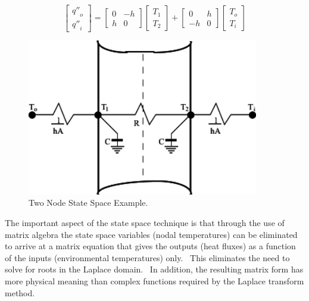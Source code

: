 \begin{equation}
\left[\begin{array}{c}{q''}_o \\ {q''}_i\end{array}\right] =
    \left[\begin{array}{cc}0 & -h \\ h & 0\end{array}\right] \left[\begin{array}{c}T_1 \\ T_2\end{array}\right] +
    \left[\begin{array}{cc}0 & h \\ -h & 0\end{array}\right] \left[\begin{array}{c}T_o \\ T_i\end{array}\right]
\end{equation}

\begin{figure}[hbtp] %
\centering
\includegraphics[width=0.9\textwidth, height=0.9\textheight, keepaspectratio=true]{media/image168.svg.png}
\caption{Two Node State Space Example. \protect \label{fig:two-node-state-space-example.}}
\end{figure}

The important aspect of the state space technique is that through the use of matrix algebra the state space variables (nodal temperatures) can be eliminated to arrive at a matrix equation that gives the outputs (heat fluxes) as a function of the inputs (environmental temperatures) only.~ This eliminates the need to solve for roots in the Laplace domain.~ In addition, the resulting matrix form has more physical meaning than complex functions required by the Laplace transform method.

